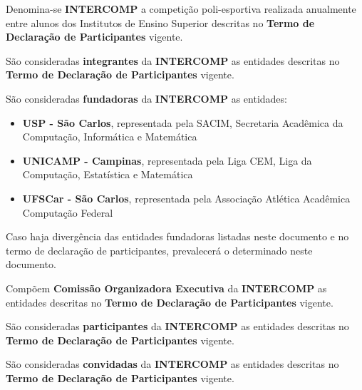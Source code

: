 \begin{article}
	\label{art:integrantes}
	Denomina-se \textbf{INTERCOMP} a competição poli-esportiva realizada anualmente entre alunos dos Institutos de Ensino Superior descritas no \textbf{Termo de Declaração de Participantes} vigente.

	\begin{xparagraph}
		São consideradas \textbf{integrantes} da \textbf{INTERCOMP} as entidades descritas no \textbf{Termo de Declaração de Participantes} vigente.
	\end{xparagraph}

	\begin{xparagraph}
		São consideradas \textbf{fundadoras} da \textbf{INTERCOMP} as entidades:
		\begin{itemize}[noitemsep,leftmargin=2\parindent]
			\item \textbf{USP - São Carlos}, representada pela SACIM, Secretaria Acadêmica da Computação, Informática e Matemática
			\item \textbf{UNICAMP - Campinas}, representada pela Liga CEM, Liga da Computação, Estatística e Matemática
			\item \textbf{UFSCar - São Carlos}, representada pela Associação Atlética Acadêmica Computação Federal
		\end{itemize}

		Caso haja divergência das entidades fundadoras listadas neste documento e no termo de declaração de participantes, prevalecerá o determinado neste documento.
	\end{xparagraph}

	\begin{xparagraph}
		Compõem \textbf{Comissão Organizadora Executiva} da \textbf{INTERCOMP} as entidades descritas no \textbf{Termo de Declaração de Participantes} vigente.
	\end{xparagraph}

	\begin{xparagraph}
		São consideradas \textbf{participantes} da \textbf{INTERCOMP} as entidades descritas no \textbf{Termo de Declaração de Participantes} vigente.
	\end{xparagraph}

	\begin{xparagraph}
		São consideradas \textbf{convidadas} da \textbf{INTERCOMP} as entidades descritas no \textbf{Termo de Declaração de Participantes} vigente.
	\end{xparagraph}


\end{article}
